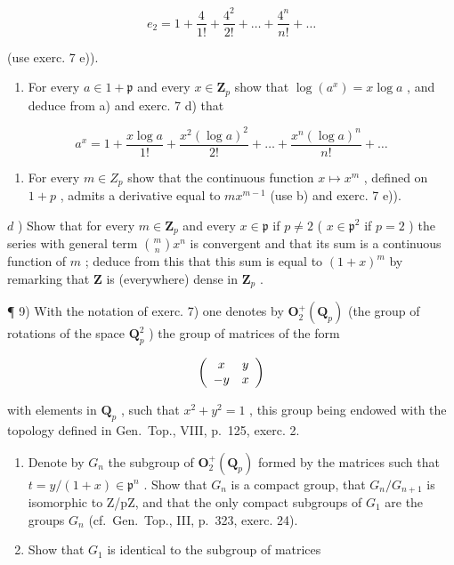 \[
e _ {2} = 1 + \frac {4}{1 !} + \frac {4 ^ {2}}{2 !} + \dots + \frac {4 ^ {n}}{n !} + \dots
\]

(use exerc. 7 e)).

\begin{enumerate}
\def\labelenumi{\alph{enumi})}
\setcounter{enumi}{1}
\tightlist
\item
  For every \(a \in 1 + \mathfrak{p}\) and every \(x \in \mathbf{Z}_p\) show that \(\log (a^x) = x\log a\) , and deduce from a) and exerc. 7 d) that
\end{enumerate}

\[
a ^ {x} = 1 + \frac {x \log a}{1 !} + \frac {x ^ {2} (\log a) ^ {2}}{2 !} + \dots + \frac {x ^ {n} (\log a) ^ {n}}{n !} + \dots
\]

\begin{enumerate}
\def\labelenumi{\alph{enumi})}
\setcounter{enumi}{2}
\tightlist
\item
  For every \(m \in Z_{p}\) show that the continuous function \(x \mapsto x^{m}\) , defined on \(1 + p\) , admits a derivative equal to \(mx^{m-1}\) (use b) and exerc. 7 e)).
\end{enumerate}

\(d\) ) Show that for every \(m\in \mathbf{Z}_p\) and every \(x\in \mathfrak{p}\) if \(p\neq 2\) ( \(x\in \mathfrak{p}^2\) if \(p = 2\) ) the series with general term \(\binom{m}{n}x^n\) is convergent and that its sum is a continuous function of \(m\) ; deduce from this that this sum is equal to \((1 + x)^m\) by remarking that \(\mathbf{Z}\) is (everywhere) dense in \(\mathbf{Z}_p\) .

¶ 9) With the notation of exerc. 7) one denotes by \(\mathbf{O}_2^+ (\mathbf{Q}_p)\) (the group of rotations of the space \(\mathbf{Q}_p^2\) ) the group of matrices of the form

\[
\left( \begin{array}{c c} x & y \\ - y & x \end{array} \right)
\]

with elements in \(\mathbf{Q}_p\) , such that \(x^2 + y^2 = 1\) , this group being endowed with the topology defined in Gen.~Top., VIII, p.~125, exerc. 2.

\begin{enumerate}
\def\labelenumi{\alph{enumi})}
\item
  Denote by \(G_{n}\) the subgroup of \(\mathbf{O}_{2}^{+}(\mathbf{Q}_{p})\) formed by the matrices such that \(t=y/(1+x)\in\mathfrak{p}^{n}\) . Show that \(G_{n}\) is a compact group, that \(G_{n}/G_{n+1}\) is isomorphic to Z/pZ, and that the only compact subgroups of \(G_{1}\) are the groups \(G_{n}\) (cf.~Gen.~Top., III, p.~323, exerc. 24).
\item
  Show that \(G_{1}\) is identical to the subgroup of matrices
\end{enumerate}

